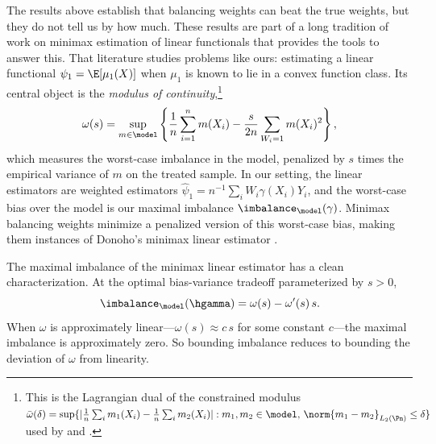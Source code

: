 
The results above establish that balancing weights can beat the true weights, but they do not tell us by how much. These results are part of a long tradition of work on minimax estimation of linear functionals \citep{ibragimov1985nonparametric, donoho1991geometrizing, donoho1994statistical, armstrong2018optimal} that provides the tools to answer this. That literature studies problems like ours: estimating a linear functional $\psi_1 = \E[\mu_1(X)]$ when $\mu_1$ is known to lie in a convex function class. Its central object is the \emph{modulus of continuity},\footnote{This is the Lagrangian dual of the constrained modulus $\bar\omega(\delta) = \sup\{|\frac{1}{n}\sum_i m_1(X_i) - \frac{1}{n}\sum_i m_2(X_i)| : m_1, m_2 \in \model,\, \norm{m_1 - m_2}_{L_2(\Pn)} \le \delta\}$ used by \citet{donoho1994statistical} and \citet{armstrong2018optimal}.}
\begin{equation}
\label{eq:modulus-of-continuity}
\omega(s) = \sup_{m \in \model} \left\{ \frac{1}{n}\sum_{i=1}^n m(X_i) - \frac{s}{2n} \sum_{W_i=1} m(X_i)^2 \right\},
\end{equation}
which measures the worst-case imbalance in the model, penalized by $s$ times the empirical variance of $m$ on the treated sample. In our setting, the linear estimators are weighted estimators $\hat\psi_1 = n^{-1}\sum_i W_i \gamma(X_i) Y_i$, and the worst-case bias over the model is our maximal imbalance $\imbalance_\model(\gamma)$. Minimax balancing weights minimize a penalized version of this worst-case bias, making them instances of Donoho's minimax linear estimator \citep{donoho1994statistical, armstrong2018optimal}.

The maximal imbalance of the minimax linear estimator has a clean characterization. At the optimal bias-variance tradeoff parameterized by $s > 0$,
\begin{equation}
\label{eq:donoho-liu-bias}
\imbalance_\model(\hgamma) = \omega(s) - \omega'(s)\,s.
\end{equation}
When $\omega$ is approximately linear---$\omega(s) \approx c\,s$ for some constant $c$---the maximal imbalance is approximately zero. So bounding imbalance reduces to bounding the deviation of $\omega$ from linearity.
